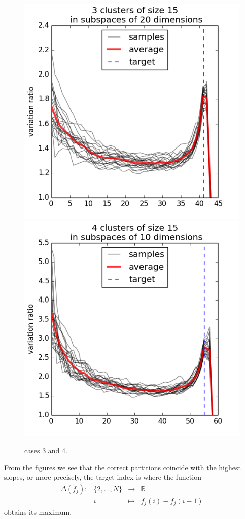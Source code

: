 \documentclass[12pt]{article}
\begin{document}
\begin{figure}[H]
    \includegraphics[width=0.50 \textwidth]{3c_s15_sbs20}
    \includegraphics[width=0.50 \textwidth]{4c_s15_sbs10}
    \caption{cases 3 and 4.}
\end{figure}

From the figures we see that the correct partitions coincide with the highest slopes, or more precisely, the target index is where the function
$$
\begin{array}{rccc}
\Delta(f_j) :&\{2, \ldots, N \} & \to & \mathbb{R} \\
& i & \mapsto & f_j(i) - f_j(i-1)
\end{array}
$$ 
obtains its maximum.

\end{document}
